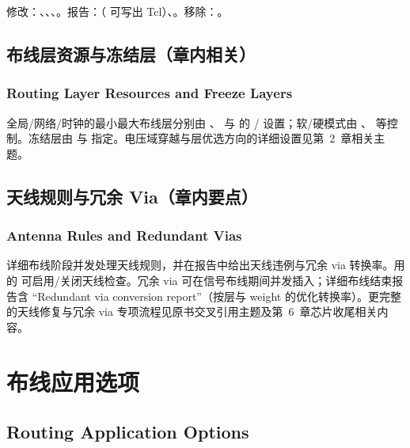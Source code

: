 修改：、、、。报告：（ 可写出 Tcl）、。移除：。

\subsection{布线层资源与冻结层（章内相关）}
\subsubsection*{Routing Layer Resources and Freeze Layers}

全局/网络/时钟的最小最大布线层分别由 、 与  的 / 设置；软/硬模式由 、 等控制。冻结层由  与  指定。电压域穿越与层优选方向的详细设置见第~2~章相关主题。

\subsection{天线规则与冗余 Via（章内要点）}
\subsubsection*{Antenna Rules and Redundant Vias}

详细布线阶段并发处理天线规则，并在报告中给出天线违例与冗余 via 转换率。用  的  可启用/关闭天线检查。冗余 via 可在信号布线期间并发插入；详细布线结束报告含 ``Redundant via conversion report''（按层与 weight 的优化转换率）。更完整的天线修复与冗余 via 专项流程见原书交叉引用主题及第~6~章芯片收尾相关内容。

\section{布线应用选项}
\subsection*{Routing Application Options}

